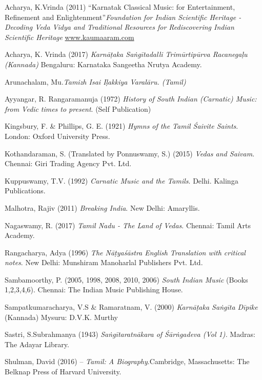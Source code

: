 \begin{thebibliography}{99}
 Acharya, K.Vrinda (2011) “Karnatak Classical Music: for Entertainment, Refinement and Enlightenment”\textit{Foundation for Indian Scientific Heritage - Decoding Veda Vidya and Traditional Resources for Rediscovering Indian Scientific Heritage} \url{www.kaumaaram.com}

  Acharya, K. Vrinda (2017) \textit{Karnāṭaka Saṅgītadalli Trimūrtipūrva Racanegaḷu (Kannada)} Bengaluru: Karnataka Sangeetha Nrutya Academy.

  Arunachalam, Mu.\textit{Tamizh Isai Iḷakkiya Varalāru. (Tamil)}

  Ayyangar, R. Rangaramanuja (1972) \textit{History of South Indian (Carnatic) Music: from Vedic} \textit{times to present}. (Self Publication)

  Kingsbury, F. \& Phillips, G. E. (1921) \textit{Hymns of the Tamil Śaivite Saints}. London: Oxford University Press.

  Kothandaraman, S. (Translated by Ponnuswamy, S.) (2015) \textit{Vedas and Saivam}. Chennai: Giri Trading Agency Pvt. Ltd.

  Kuppuswamy, T.V. (1992) \textit{Carnatic Music and the Tamils}. Delhi. Kalinga Publications.

  Malhotra, Rajiv (2011) \textit{Breaking India}. New Delhi: Amaryllis.

  Nagaswamy, R. (2017) \textit{Tamil Nadu - The Land of Vedas}. Chennai: Tamil Arts Academy.

  Rangacharya, Adya (1996) \textit{The Nāṭyaśāstra English Translation with critical notes}. New Delhi: Munshiram Manoharlal Publishers Pvt. Ltd.

  Sambamoorthy, P. (2005, 1998, 2008, 2010, 2006) \textit{South Indian Music} (Books 1,2,3,4,6). Chennai: The Indian Music Publishing House.

  Sampatkumaracharya, V.S \& Ramaratnam, V. (2000) \textit{Karnāṭaka Saṅgīta Dīpike} (Kannada) Mysuru: D.V.K. Murthy

  Sastri, S.Subrahmanya (1943) \textit{Saṅgītaratnākara of Śārṅgadeva (Vol 1).} Madras: The Adayar Library.

  Shulman, David (2016) – \textit{Tamil: A Biography}.Cambridge, Massachusetts: The Belknap Press of Harvard University.


\end{thebibliography}
